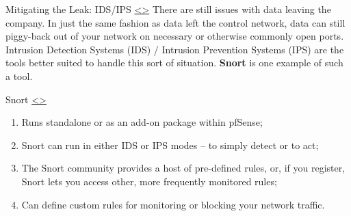 \documentclass[12pt]{extarticle}
\newenvironment{instructionblock}{\Large\bgroup}{\egroup}
\newcommand{\ben}{\begin{enumerate}}
\newcommand{\een}{\end{enumerate}}
\begin{document}
\vspace{8mm}
\noindent








\pagebreak
\begin{slide}{ Mitigating the Leak: IDS/IPS }{ \hyperref[slide 14]{\textless}\hyperref[slide 16]{\textgreater} }
	\vskip 5pt
\begin{instructionblock}
    There are still issues with data leaving the company. In just the same fashion as data left the control network, data can still piggy-back out of your network on necessary or otherwise commonly open ports.\\
    
    Intrusion Detection Systems (IDS) / Intrusion Prevention Systems (IPS) are the tools better suited to handle this sort of situation. \textbf{Snort} is one example of such a tool.
\end{instructionblock}
\end{slide}


\vspace{8mm}
\noindent








\pagebreak
\begin{slide}{ Snort }{ \hyperref[slide 15]{\textless}\hyperref[slide 17]{\textgreater} }
	\vskip 5pt
\begin{instructionblock}
    \ben
    \item Runs standalone or as an add-on package within pfSense;
    \item Snort can run in either IDS or IPS modes -- to simply detect or to act;
    \item The Snort community provides a host of pre-defined rules, or, if you register, Snort lets you access other, more frequently monitored rules;
    \item Can define custom rules for monitoring or blocking your network traffic.
    \een
\end{instructionblock}
\end{slide}
\end{document}
